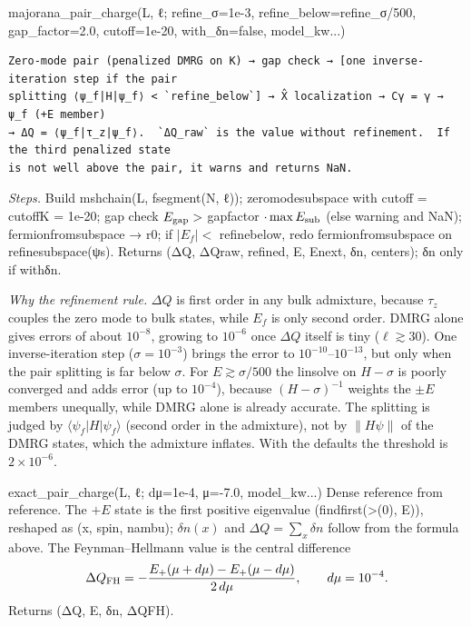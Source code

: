 \documentclass[11pt]{article}
\newcommand{\codeus}{\textunderscore\allowbreak}
\renewcommand{\code}[1]{{\ttfamily\let\_\codeus #1}}
\begin{document}
\begin{function}{majorana\_pair\_charge(L, ℓ; refine\_σ=1e-3, refine\_below=refine\_σ/500, gap\_factor=2.0, cutoff=1e-20, with\_δn=false, model\_kw...)}
\begin{Verbatim}
Zero-mode pair (penalized DMRG on K) → gap check → [one inverse-iteration step if the pair
splitting ⟨ψ_f|H|ψ_f⟩ < `refine_below`] → X̂ localization → Cγ = γ → ψ_f (+E member)
→ ΔQ = ⟨ψ_f|τ_z|ψ_f⟩.  `ΔQ_raw` is the value without refinement.  If the third penalized state
is not well above the pair, it warns and returns NaN.
\end{Verbatim}
\emph{Steps.} Build \code{msh\_chain(L, f\_segment(N, ℓ))}; \code{zero\_mode\_subspace} with \code{cutoff = cutoff\_K = 1e-20}; gap check $E_{\rm gap}>$ \code{gap\_factor} $\cdot\max E_{\rm sub}$ (else warning and \code{NaN}); \code{fermion\_from\_subspace} → \code{r0}; if $|E_f|<$ \code{refine\_below}, redo \code{fermion\_from\_subspace} on \code{refine\_subspace(ψs)}. Returns \code{(ΔQ, ΔQ\_raw, refined, E, E\_next, δn, centers)}; \code{δn} only if \code{with\_δn}.

\emph{Why the refinement rule.} $\Delta Q$ is first order in any bulk admixture, because $\tau_z$ couples the zero mode to bulk states, while $E_f$ is only second order. DMRG alone gives errors of about $10^{-8}$, growing to $10^{-6}$ once $\Delta Q$ itself is tiny ($\ell\gtrsim30$). One inverse-iteration step ($\sigma=10^{-3}$) brings the error to $10^{-10}$–$10^{-13}$, but only when the pair splitting is far below $\sigma$. For $E\gtrsim\sigma/500$ the \code{linsolve} on $H-\sigma$ is poorly converged and adds error (up to $10^{-4}$), because $(H-\sigma)^{-1}$ weights the $\pm E$ members unequally, while DMRG alone is already accurate. The splitting is judged by $\langle\psi_f|H|\psi_f\rangle$ (second order in the admixture), not by $\|H\psi\|$ of the DMRG states, which the admixture inflates. With the defaults the threshold is $2\times10^{-6}$.
\end{function}

\begin{function}{exact\_pair\_charge(L, ℓ; dμ=1e-4, μ=-7.0, model\_kw...)}
Dense reference from \code{reference}. The $+E$ state is the first positive eigenvalue (\code{findfirst(>(0), E)}), reshaped as \code{(x, spin, nambu)}; $\delta n(x)$ and $\Delta Q=\sum_x\delta n$ follow from the formula above. The Feynman–Hellmann value is the central difference
\[
\Delta Q_{\rm FH}=-\frac{E_+(\mu+d\mu)-E_+(\mu-d\mu)}{2\,d\mu},\qquad d\mu=10^{-4}.
\]
Returns \code{(ΔQ, E, δn, ΔQ\_FH)}.
\end{function}
\end{document}
